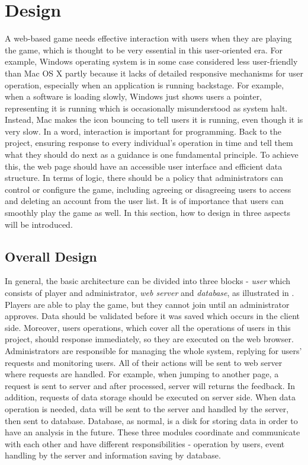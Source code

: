 \chapter{Design}
A web-based game needs effective interaction with users when they are playing the game, which is thought to be very essential in this user-oriented era. For example, Windows operating system is in some case considered less user-friendly than Mac OS X partly because it lacks of detailed responsive mechanisms for user operation, especially when an application is running backstage. For example, when a software is loading slowly, Windows just shows users a pointer, representing it is running which is occasionally  misunderstood as system halt. Instead, Mac makes the icon bouncing to tell users it is running, even though it is very slow. In a word, interaction is important for programming. Back to the project, ensuring response to every individual's operation in time and tell them what they should do next as a guidance is one fundamental principle. To achieve this, the web page should have an accessible user interface and efficient data structure. In terms of logic, there should be a policy that administrators can control or configure the game, including agreeing or disagreeing users to access and deleting an account from the user list. It is of importance that users can smoothly play the game as well. In this section, how to design in three aspects will be introduced.
\section{Overall Design}
In general, the basic architecture can be divided into three blocks - \textit{user} which consists of player and administrator, \textit{web server} and \textit{database}, as illustrated in . Players are able to play the game, but they cannot join until an administrator approves. Data should be validated before it was saved which occurs in the client side. Moreover, users operations, which cover all the operations of users in this project, should response immediately, so they are executed on the web browser. Administrators are responsible for managing the whole system, replying for users' requests and monitoring users. All of their actions will be sent to web server where requests are handled. For example, when jumping to another page, a request is sent to server and after processed, server will returns the feedback. In addition, requests of data storage should be executed on server side. When data operation is needed, data will be sent to the server and handled by the server, then sent to database. Database, as normal, is a disk for storing data in order to have an analysis in the future. These three modules coordinate and communicate with each other and have different responsibilities - operation by users, event handling by the server and information saving by database.

